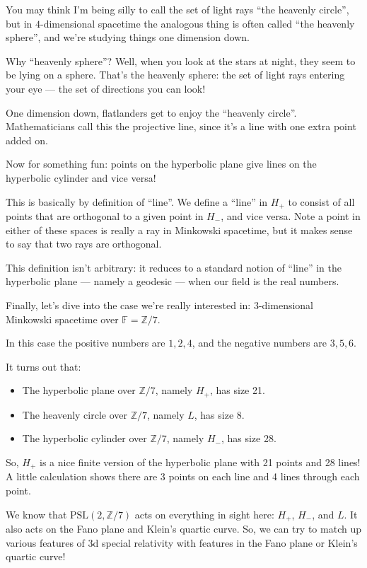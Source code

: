 \documentclass{article}
\def\tightlist{}
\begin{document}
You may think I'm being silly to call the set of light rays ``the
heavenly circle'', but in \(4\)-dimensional spacetime the analogous
thing is often called ``the heavenly sphere'', and we're studying things
one dimension down.

Why ``heavenly sphere''? Well, when you look at the stars at night, they
seem to be lying on a sphere. That's the heavenly sphere: the set of
light rays entering your eye --- the set of directions you can look!

One dimension down, flatlanders get to enjoy the ``heavenly circle''.
Mathematicians call this the projective line, since it's a line with one
extra point added on.

Now for something fun: points on the hyperbolic plane give lines on the
hyperbolic cylinder and vice versa!

This is basically by definition of ``line''. We define a ``line'' in
\(H_+\) to consist of all points that are orthogonal to a given point in
\(H_-\), and vice versa. Note a point in either of these spaces is
really a ray in Minkowski spacetime, but it makes sense to say that two
rays are orthogonal.

This definition isn't arbitrary: it reduces to a standard notion of
``line'' in the hyperbolic plane --- namely a geodesic --- when our
field is the real numbers.

Finally, let's dive into the case we're really interested in:
\(3\)-dimensional Minkowski spacetime over
\(\mathbb{F} = \mathbb{Z}/7\).

In this case the positive numbers are \(1,2,4\), and the negative
numbers are \(3,5,6\).

It turns out that:

\begin{itemize}
\tightlist
\item
  The hyperbolic plane over \(\mathbb{Z}/7\), namely \(H_+\), has size
  21.
\item
  The heavenly circle over \(\mathbb{Z}/7\), namely \(L\), has size 8.
\item
  The hyperbolic cylinder over \(\mathbb{Z}/7\), namely \(H_-\), has
  size 28.
\end{itemize}

So, \(H_+\) is a nice finite version of the hyperbolic plane with 21
points and 28 lines! A little calculation shows there are 3 points on
each line and 4 lines through each point.

We know that \(\mathrm{PSL}(2,\mathbb{Z}/7)\) acts on everything in
sight here: \(H_+\), \(H_-\), and \(L\). It also acts on the Fano plane
and Klein's quartic curve. So, we can try to match up various features
of 3d special relativity with features in the Fano plane or Klein's
quartic curve!
\end{document}

